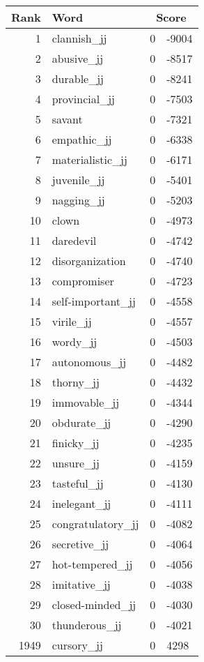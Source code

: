 \begin{longtable}[!htbp]{| rlr@{.}l |}
    \hline
    \textbf{Rank} & \textbf{Word} & \multicolumn{2}{c|}{\textbf{Score}} \\
    \hline
    \endhead
    1 & clannish\_jj & 0 & -9004 \\
    2 & abusive\_jj & 0 & -8517 \\
    3 & durable\_jj & 0 & -8241 \\
    4 & provincial\_jj & 0 & -7503 \\
    5 & savant & 0 & -7321 \\
    6 & empathic\_jj & 0 & -6338 \\
    7 & materialistic\_jj & 0 & -6171 \\
    8 & juvenile\_jj & 0 & -5401 \\
    9 & nagging\_jj & 0 & -5203 \\
    10 & clown & 0 & -4973 \\
    11 & daredevil & 0 & -4742 \\
    12 & disorganization & 0 & -4740 \\
    13 & compromiser & 0 & -4723 \\
    14 & self-important\_jj & 0 & -4558 \\
    15 & virile\_jj & 0 & -4557 \\
    16 & wordy\_jj & 0 & -4503 \\
    17 & autonomous\_jj & 0 & -4482 \\
    18 & thorny\_jj & 0 & -4432 \\
    19 & immovable\_jj & 0 & -4344 \\
    20 & obdurate\_jj & 0 & -4290 \\
    21 & finicky\_jj & 0 & -4235 \\
    22 & unsure\_jj & 0 & -4159 \\
    23 & tasteful\_jj & 0 & -4130 \\
    24 & inelegant\_jj & 0 & -4111 \\
    25 & congratulatory\_jj & 0 & -4082 \\
    26 & secretive\_jj & 0 & -4064 \\
    27 & hot-tempered\_jj & 0 & -4056 \\
    28 & imitative\_jj & 0 & -4038 \\
    29 & closed-minded\_jj & 0 & -4030 \\
    30 & thunderous\_jj & 0 & -4021 \\
    1949 & cursory\_jj & 0 & 4298 \\

\end{longtable}
